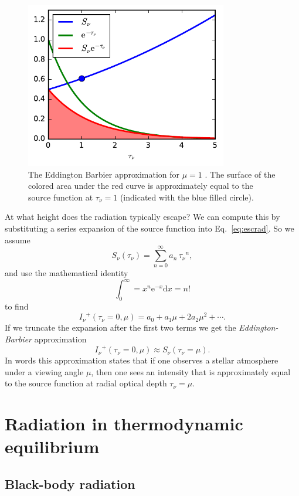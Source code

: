 \documentclass[12pt]{article}
\numberwithin{equation}{section}
\def\exp{\mathrm{e}}
\def\dd{\mathrm{d}}
\def\Inu{\ensuremath{I_{\nu}}}
\def\Snu{\ensuremath{S_{\nu}}}
\def\taunu{\ensuremath{\tau_{\nu}}}
\newcommand{\be}{\begin{equation}}
\newcommand{\ee}{\end{equation}}
\begin{document}
\begin{figure}
  \centering
  \includegraphics[width=8.8cm]{figs/eddington_barbier}
  \caption{The Eddington Barbier approximation for $\mu=1$  \label{fig:EB}. The surface of the colored area under the red curve is approximately equal to the source function at $\taunu=1$ (indicated with the blue filled circle).}
\end{figure}

At what height does the radiation typically escape? We can compute this by substituting a series expansion of the source function into Eq.~\ref{eq:escrad}. So we assume
\be
  \Snu(\taunu) = \sum_{n=0}^\infty a_n \, \taunu^n,
\ee
and use the mathematical identity
\be
\int_0^\infty = x^n \exp^{-x} \dd x = n!
\ee
to find
\be
\Inu^+(\taunu=0,\mu) = a_0 + a_1 \mu + 2 a_2 \mu^2 + \cdots.
\ee 
If we truncate the expansion after the first two terms we get the {\it Eddington-Barbier} approximation
\be
\Inu^+(\taunu=0,\mu) \approx \Snu(\taunu=\mu).
\ee 
In words this approximation states that if one observes a stellar atmosphere under a viewing angle $\mu$, then one sees an intensity that is approximately equal to the source function at radial optical depth $\taunu=\mu$.

\section{Radiation in thermodynamic equilibrium}

\subsection{Black-body radiation}
\end{document}
